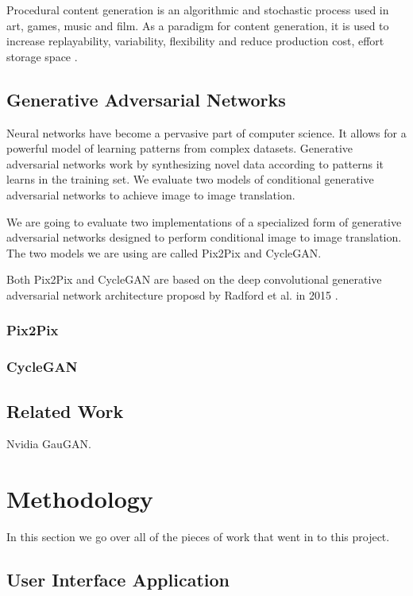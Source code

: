\documentclass[twocolumn]{article}
\begin{document}
	Procedural content generation is an algorithmic and stochastic process used in art, games, music and film. As a paradigm for content generation, it is used to increase replayability, variability, flexibility and reduce production cost, effort storage space \cite{summerville2017procedural}.

	\subsection{Generative Adversarial Networks}
	
	Neural networks have become a pervasive part of computer science. It allows for a powerful model of learning patterns from complex datasets. Generative adversarial networks work by synthesizing novel data according to patterns it learns in the training set. We evaluate two models of conditional generative adversarial networks to achieve image to image translation.
	
	We are going to evaluate two implementations of a specialized form of generative adversarial networks designed to perform conditional image to image translation. The two models we are using are called Pix2Pix and CycleGAN.
	
	Both Pix2Pix and CycleGAN are based on the deep convolutional generative adversarial network architecture proposd by Radford et al. in 2015 \cite{radford2015unsupervised}.
	
	\subsubsection{Pix2Pix}
	
	\subsubsection{CycleGAN}

	\subsection{Related Work}

	Nvidia GauGAN.
	
	\section{Methodology}
	
	In this section we go over all of the pieces of work that went in to this project.
	
	\subsection{User Interface Application}
	
\end{document}
